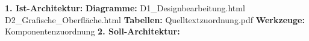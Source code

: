 \textbf{1. Ist-Architektur:}\newline
\indent \textbf{Diagramme:}\newline
\indent \indent D1\_Designbearbeitung.html\newline
\indent \indent D2\_Grafische\_Oberfläche.html\newline
\indent \textbf{Tabellen:}\newline
\indent \indent Quelltextzuordnung.pdf\newline
\indent \textbf{Werkzeuge:}\newline
\indent \indent Komponentenzuordnung\newline
\textbf{2. Soll-Architektur:}